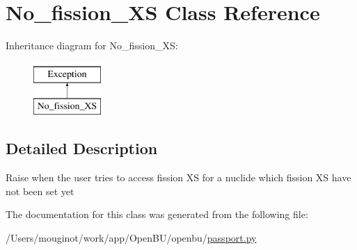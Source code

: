 \hypertarget{classopenbu_1_1passport_1_1_no__fission___x_s}{}\section{No\+\_\+fission\+\_\+\+XS Class Reference}
\label{classopenbu_1_1passport_1_1_no__fission___x_s}
Inheritance diagram for No\+\_\+fission\+\_\+\+XS\+:\begin{figure}[H]
\begin{center}
\leavevmode
\includegraphics[height=2.000000cm]{classopenbu_1_1passport_1_1_no__fission___x_s}
\end{center}
\end{figure}


\subsection{Detailed Description}
\begin{DoxyVerb}Raise when the user tries to access fission XS for a nuclide which fission XS have not been set yet \end{DoxyVerb}
 

The documentation for this class was generated from the following file\+:\begin{DoxyCompactItemize}
\item 
/\+Users/mouginot/work/app/\+Open\+B\+U/openbu/\mbox{\hyperlink{passport_8py}{passport.\+py}}\end{DoxyCompactItemize}
